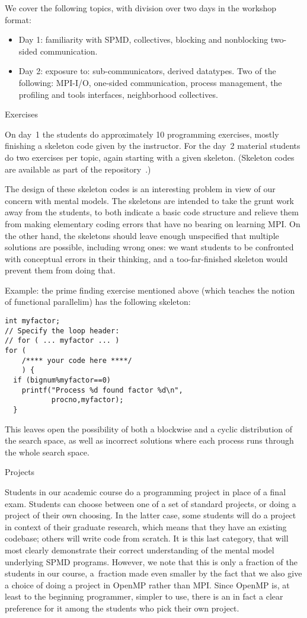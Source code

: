 We cover the following topics, with division over two days in the
workshop format:
\begin{itemize}
\item Day 1: familiarity with SPMD, collectives, blocking and
  nonblocking two-sided communication.
\item Day 2: exposure to: sub-communicators, derived datatypes.
  Two of the following: MPI-I/O, one-sided communication, process
  management, the profiling and tools interfaces, neighborhood collectives.
\end{itemize}

 {Exercises}

On day~1 the students do approximately 10 programming exercises,
mostly finishing a skeleton code given by the instructor.
For the day~2 material students do two exercises per topic, again
starting with a given skeleton. (Skeleton codes are available as part
of the repository~\cite{Eijkhout:MPI}.)

The design of these skeleton codes is an interesting problem in view
of our concern with mental models. The
skeletons are intended to take the grunt work away from the students,
to both indicate a basic code structure and relieve them from making
elementary coding errors that have no bearing on learning MPI. On the
other hand, the skeletons should leave enough unspecified that
multiple solutions are possible, including wrong ones: we want
students to be confronted with conceptual errors in their thinking,
and a too-far-finished skeleton would prevent them from doing that.

Example: the prime finding exercise mentioned above (which teaches the
notion of functional parallelim) has the following skeleton:
{\small
\begin{verbatim}
int myfactor;
// Specify the loop header:
// for ( ... myfactor ... )
for (
    /**** your code here ****/
    ) {
  if (bignum%myfactor==0)
    printf("Process %d found factor %d\n",
           procno,myfactor);
  }
\end{verbatim}
}
%
This leaves open the possibility of both a blockwise and a cyclic
distribution of the search space, as well as incorrect solutions where
each process runs through the whole search space.

 {Projects}

Students in our academic course do a programming project in place of a
final exam. Students can choose between one of a set of standard
projects, or doing a project of their own choosing. In the latter
case, some students will do a project in context of their graduate
research, which means that they have an existing codebase; others will
write code from scratch. It is this last category, that will most
clearly demonstrate their correct understanding of the mental model
underlying \ac{SPMD} programs. However, we note that this is only a
fraction of the students in our course, a~fraction made even smaller
by the fact that we also give a choice of doing a project in OpenMP
rather than MPI. Since OpenMP is, at least to the beginning
programmer, simpler to use, there is an in fact a clear preference for it
among the students who pick their own project.


